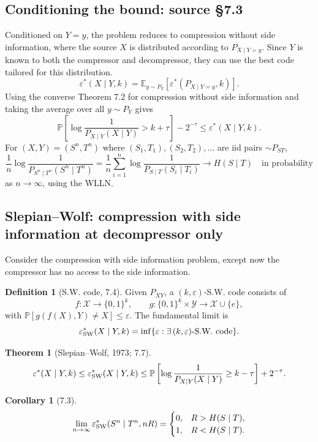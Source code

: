 \documentclass[UTF8,11pt,a4paper]{ctexart}
\newtheorem*{theorem}{Theorem}
\newtheorem*{corollary}{Corollary}
\theoremstyle{definition}\newtheorem*{definition}{Definition}
\theoremstyle{remark}\newtheorem*{remark}{Remark}
\newcommand{\E}{\mathbb E}
\newcommand{\Prob}{\mathbb P}
\newcommand{\eps}{\varepsilon}
\begin{document}
\subsection*{Conditioning the bound: source \S7.3}
Conditioned on $Y=y$, the problem reduces to compression without side information, where the source $X$ is distributed according to $P_{X\mid Y=y}$. Since $Y$ is known to both the compressor and decompressor, they can use the best code tailored for this distribution.
\[
\eps^*(X\mid Y,k)=\E_{y\sim P_Y}[\eps^*(P_{X\mid Y=y},k)].
\]
Using the converse Theorem 7.2 for compression without side information and taking the average over all $y\sim P_Y$ gives
\[
\Prob\left[\log\frac1{P_{X\mid Y}(X\mid Y)}>k+\tau\right]-2^{-\tau}
\le\eps^*(X\mid Y,k).
\]
For $(X,Y)=(S^n,T^n)$ where $(S_1,T_1),(S_2,T_2),\ldots$ are iid pairs $\sim P_{ST}$,
\[
\frac1n\log\frac1{P_{S^n\mid T^n}(S^n\mid T^n)}
=\frac1n\sum_{i=1}^n\log\frac1{P_{S\mid T}(S_i\mid T_i)}
\longrightarrow H(S\mid T)\quad\text{in probability}
\]
as $n\to\infty$, using the WLLN.

\subsection*{Slepian--Wolf: compression with side information at decompressor only}
Consider the compression with side information problem, except now the compressor has no access to the side information.
\begin{center}
\end{center}
\begin{definition}[S.W. code, 7.4]
Given $P_{XY}$, a $(k,\eps)$-S.W. code consists of
\[
f:\mathcal X\to\{0,1\}^k,\qquad
g:\{0,1\}^k\times\mathcal Y\to\mathcal X\cup\{e\},
\]
with $\Prob[g(f(X),Y)\ne X]\le\eps$. The fundamental limit is
\[
\eps^*_{\rm SW}(X\mid Y,k)=\inf\{\eps:\exists\,(k,\eps)\text{-S.W. code}\}.
\]
\end{definition}
\begin{theorem}[Slepian--Wolf, 1973; 7.7]
\[
\eps^*(X\mid Y,k)\le\eps^*_{\rm SW}(X\mid Y,k)
\le\Prob\left[\log\frac1{P_{X\mid Y}(X\mid Y)}\ge k-\tau\right]+2^{-\tau}.
\]
\end{theorem}
\begin{corollary}[7.3]
\[
\lim_{n\to\infty}\eps^*_{\rm SW}(S^n\mid T^n,nR)
=\begin{cases}0,&R>H(S\mid T),\\1,&R<H(S\mid T).
\end{cases}
\]
\end{corollary}
\end{document}
